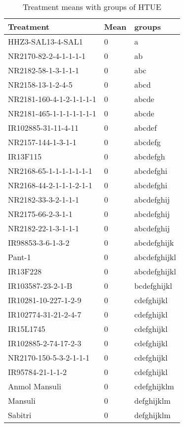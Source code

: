 \documentclass[]{article}
\begin{document}
\begin{longtable}{lll}
\caption{\label{tab:two-fac-groups-tab-agroclimate-normal}Treatment means with groups of HTUE}\\
\toprule
Treatment & Mean & groups\\
\midrule
\rowcolor{gray!6}  HHZ3-SAL13-4-SAL1 & 0 & a\\
NR2170-82-2-4-1-1-1-1 & 0 & ab\\
\rowcolor{gray!6}  NR2182-58-1-3-1-1-1 & 0 & abc\\
NR2158-13-1-2-4-5 & 0 & abcd\\
\rowcolor{gray!6}  NR2181-160-4-1-2-1-1-1-1 & 0 & abcde\\
\addlinespace
NR2181-465-1-1-1-1-1-1-1 & 0 & abcde\\
\rowcolor{gray!6}  IR102885-31-11-4-11 & 0 & abcdef\\
NR2157-144-1-3-1-1 & 0 & abcdefg\\
\rowcolor{gray!6}  IR13F115 & 0 & abcdefgh\\
NR2168-65-1-1-1-1-1-1-1 & 0 & abcdefghi\\
\addlinespace
\rowcolor{gray!6}  NR2168-44-2-1-1-1-2-1-1 & 0 & abcdefghi\\
NR2182-33-3-2-1-1-1 & 0 & abcdefghij\\
\rowcolor{gray!6}  NR2175-66-2-3-1-1 & 0 & abcdefghij\\
NR2182-22-1-3-1-1-1 & 0 & abcdefghij\\
\rowcolor{gray!6}  IR98853-3-6-1-3-2 & 0 & abcdefghijk\\
\addlinespace
Pant-1 & 0 & abcdefghijkl\\
\rowcolor{gray!6}  IR13F228 & 0 & abcdefghijkl\\
IR103587-23-2-1-B & 0 & bcdefghijkl\\
\rowcolor{gray!6}  IR10281-10-227-1-2-9 & 0 & cdefghijkl\\
IR102774-31-21-2-4-7 & 0 & cdefghijkl\\
\addlinespace
\rowcolor{gray!6}  IR15L1745 & 0 & cdefghijkl\\
IR102885-2-74-17-2-3 & 0 & cdefghijkl\\
\rowcolor{gray!6}  NR2170-150-5-3-2-1-1-1 & 0 & cdefghijkl\\
IR95784-21-1-1-2 & 0 & cdefghijkl\\
\rowcolor{gray!6}  Anmol Mansuli & 0 & cdefghijklm\\
\addlinespace
Mansuli & 0 & defghijklm\\
\rowcolor{gray!6}  Sabitri & 0 & defghijklm\\

\end{longtable}
\end{document}

